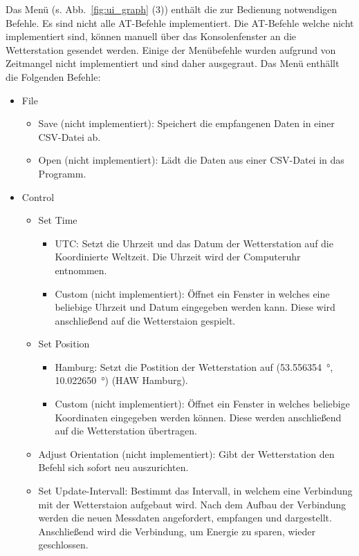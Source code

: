 Das Menü (s. Abb.~\ref{fig:ui_graph} (3)) enthält die zur Bedienung notwendigen Befehle. Es sind nicht alle AT-Befehle implementiert. Die AT-Befehle welche nicht implementiert sind, können manuell über das Konsolenfenster an die Wetterstation gesendet werden. Einige der Menübefehle wurden aufgrund von Zeitmangel nicht implementiert und sind daher ausgegraut. Das Menü enthällt die Folgenden Befehle:
\begin{itemize}
\item File
  \begin{itemize}
  \item Save (nicht implementiert): Speichert die empfangenen Daten in einer CSV-Datei ab.
  \item Open (nicht implementiert): Lädt die Daten aus einer CSV-Datei in das Programm.
  \end{itemize}
\item Control
  \begin{itemize}
  \item Set Time
    \begin{itemize}
    \item UTC: Setzt die Uhrzeit und das Datum der Wetterstation auf die Koordinierte Weltzeit. Die Uhrzeit wird der Computeruhr entnommen.
    \item Custom (nicht implementiert): Öffnet ein Fenster in welches eine beliebige Uhrzeit und Datum eingegeben werden kann. Diese wird anschließend auf die Wetterstaion gespielt.
    \end{itemize}
  \item Set Position
    \begin{itemize}
    \item Hamburg: Setzt die Postition der Wetterstation auf (\SI{53.556354}{\degree}, \SI{10.022650}{\degree}) (HAW Hamburg).
    \item Custom (nicht implementiert): Öffnet ein Fenster in welches beliebige Koordinaten eingegeben werden können. Diese werden anschließend auf die Wetterstation übertragen.
    \end{itemize}
  \item Adjust Orientation (nicht implementiert): Gibt der Wetterstation den Befehl sich sofort neu auszurichten.
  \item Set Update-Intervall: Bestimmt das Intervall, in welchem eine Verbindung mit der Wetterstaion aufgebaut wird. Nach dem Aufbau der Verbindung werden die neuen Messdaten angefordert, empfangen und dargestellt. Anschließend wird die Verbindung, um Energie zu sparen, wieder geschlossen.

\end{itemize}
\end{itemize}
